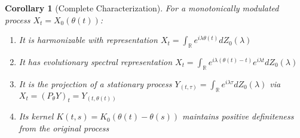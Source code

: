 \documentclass{article}
\newtheorem{corollary}{Corollary}
\begin{document}
\begin{corollary}[Complete Characterization]
For a monotonically modulated process $X_t = X_0(\theta(t))$:
\begin{enumerate}
\item It is harmonizable with representation $X_t = \int_{\mathbb{R}} e^{i\lambda\theta(t)} dZ_0(\lambda)$
\item It has evolutionary spectral representation $X_t = \int_{\mathbb{R}} e^{i\lambda(\theta(t)-t)}e^{i\lambda t}dZ_0(\lambda)$
\item It is the projection of a stationary process $Y_{(t,\tau)} = \int_{\mathbb{R}} e^{i\lambda\tau}dZ_0(\lambda)$ via $X_t = (P_\theta Y)_t = Y_{(t,\theta(t))}$
\item Its kernel $K(t,s) = K_0(\theta(t)-\theta(s))$ maintains positive definiteness from the original process
\end{enumerate}
\end{corollary}
\end{document}
